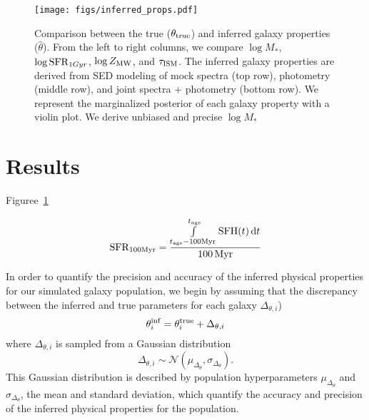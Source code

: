 \begin{figure}
\begin{center}
\texttt{[image: figs/inferred\_props.pdf]}
\caption{
    Comparison between the true ($\theta_{\rm true}$) and inferred galaxy
    properties ($\hat{\theta}$). 
    From the left to right columns, we compare $\log M_*$, $\log {\rm
    SFR}_{1Gyr}$, $\log Z_{\rm MW}$, and $\tau_{\rm ISM}$. 
    The inferred galaxy properties are derived from SED modeling of mock
    spectra (top row), photometry (middle row), and joint spectra + photometry
    (bottom row). 
    We represent the marginalized posterior of each galaxy property with a
    violin plot.  
    We derive unbiased and precise $\log M_*$
}
\label{fig:prop_inf}
\end{center}
\end{figure}

\section{Results} \label{sec:results}
Figuree~\ref{fig:prop_inf} 


\begin{equation}
    {\rm SFR}_{100{\rm Myr}} = \frac{\int\limits_{t_{\rm age} - 100{\rm
    Myr}}^{t_{\rm age}}{\rm SFH}(t)\,{\rm d}t}{100\,{\rm Myr}}
\end{equation} 


In order to quantify the precision and accuracy of the inferred physical
properties for our simulated galaxy population, we begin by assuming that the
discrepancy between the inferred and true parameters for each galaxy 
$\Delta_{\theta,i}$) 
\begin{equation}
    \theta^{\rm inf}_i = \theta^{\rm true}_i + \Delta_{\theta,i}
\end{equation}
where $\Delta_{\theta,i}$ is sampled from a Gaussian distribution
\begin{equation}
    \Delta_{\theta,i} \sim \mathcal{N}(\mu_{\Delta_{\theta}}, \sigma_{\Delta_{\theta}}).
\end{equation}
This Gaussian distribution is described by population hyperparameters $\mu_{\Delta_{\theta}}$ and 
$\sigma_{\Delta_{\theta}}$, the mean and standard deviation, which quantify the accuracy and 
precision of the inferred physical properties for the population. 

